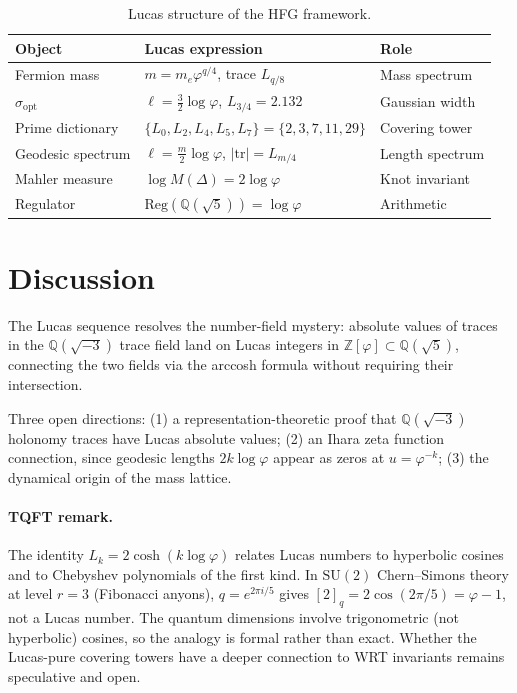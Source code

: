 \documentclass[12pt]{article}
\theoremstyle{definition}
\newcommand{\Z}{\mathbb{Z}}
\newcommand{\Q}{\mathbb{Q}}
\newcommand{\ph}{\varphi}
\newcommand{\logph}{\log\ph}
\begin{document}
\begin{table}[h]
\centering
\caption{Lucas structure of the HFG framework.}
\label{tab:unified}
\begin{tabular}{lll}
\toprule
Object & Lucas expression & Role \\
\midrule
Fermion mass & $m = m_e\ph^{q/4}$, trace $L_{q/8}$ & Mass spectrum \\
$\sigma_{\mathrm{opt}}$ & $\ell = \tfrac{3}{2}\logph$, $L_{3/4}=2.132$ & Gaussian width \\
Prime dictionary & $\{L_0,L_2,L_4,L_5,L_7\}=\{2,3,7,11,29\}$ & Covering tower \\
Geodesic spectrum & $\ell = \tfrac{m}{2}\logph$, $|\mathrm{tr}|=L_{m/4}$ & Length spectrum \\
Mahler measure & $\log M(\Delta) = 2\logph$ & Knot invariant \\
Regulator & $\mathrm{Reg}(\Q(\sqrt{5})) = \logph$ & Arithmetic \\
\bottomrule
\end{tabular}
\end{table}

\section{Discussion}

The Lucas sequence resolves the number-field mystery: absolute values
of traces in the $\Q(\sqrt{-3})$ trace field land on Lucas integers
in $\Z[\ph] \subset \Q(\sqrt{5})$, connecting the two fields via
the arccosh formula without requiring their intersection.

Three open directions: (1) a representation-theoretic proof that
$\Q(\sqrt{-3})$ holonomy traces have Lucas absolute values; (2) an
Ihara zeta function connection, since geodesic lengths $2k\logph$
appear as zeros at $u = \ph^{-k}$; (3) the dynamical origin of the
mass lattice.

\paragraph{TQFT remark.}
The identity $L_k = 2\cosh(k\logph)$ relates Lucas numbers to
hyperbolic cosines and to Chebyshev polynomials of the first kind.
In $\mathrm{SU}(2)$ Chern--Simons theory at level $r=3$ (Fibonacci
anyons), $q = e^{2\pi i/5}$ gives $[2]_q = 2\cos(2\pi/5) = \ph-1$,
not a Lucas number. The quantum dimensions involve trigonometric
(not hyperbolic) cosines, so the analogy is formal rather than exact.
Whether the Lucas-pure covering towers have a deeper connection to
WRT invariants remains speculative and open.
\end{document}
